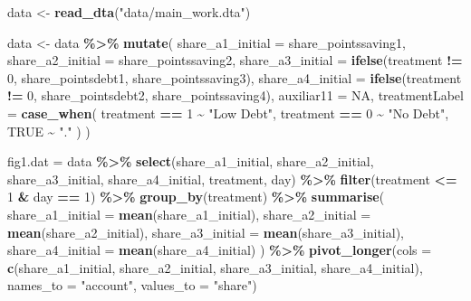 \documentclass[
]{article}
\newenvironment{Shaded}{\begin{snugshade}}{\end{snugshade}}
\newcommand{\AttributeTok}[1]{\textcolor[rgb]{0.13,0.29,0.53}{#1}}
\newcommand{\ConstantTok}[1]{\textcolor[rgb]{0.56,0.35,0.01}{#1}}
\newcommand{\DecValTok}[1]{\textcolor[rgb]{0.00,0.00,0.81}{#1}}
\newcommand{\FunctionTok}[1]{\textcolor[rgb]{0.13,0.29,0.53}{\textbf{#1}}}
\newcommand{\NormalTok}[1]{#1}
\newcommand{\OtherTok}[1]{\textcolor[rgb]{0.56,0.35,0.01}{#1}}
\newcommand{\SpecialCharTok}[1]{\textcolor[rgb]{0.81,0.36,0.00}{\textbf{#1}}}
\newcommand{\StringTok}[1]{\textcolor[rgb]{0.31,0.60,0.02}{#1}}
\begin{document}
\begin{Shaded}
\begin{Highlighting}[]
\NormalTok{data }\OtherTok{\textless{}{-}} \FunctionTok{read\_dta}\NormalTok{(}\StringTok{"data/main\_work.dta"}\NormalTok{)}

\NormalTok{data }\OtherTok{\textless{}{-}}\NormalTok{ data }\SpecialCharTok{\%\textgreater{}\%}
  \FunctionTok{mutate}\NormalTok{(}
    \AttributeTok{share\_a1\_initial =}\NormalTok{ share\_pointssaving1,}
    \AttributeTok{share\_a2\_initial =}\NormalTok{ share\_pointssaving2,}
    \AttributeTok{share\_a3\_initial =} \FunctionTok{ifelse}\NormalTok{(treatment }\SpecialCharTok{!=} \DecValTok{0}\NormalTok{, share\_pointsdebt1, share\_pointssaving3),}
    \AttributeTok{share\_a4\_initial =} \FunctionTok{ifelse}\NormalTok{(treatment }\SpecialCharTok{!=} \DecValTok{0}\NormalTok{, share\_pointsdebt2, share\_pointssaving4),}
    \AttributeTok{auxiliar11 =} \ConstantTok{NA}\NormalTok{,}
    \AttributeTok{treatmentLabel =} \FunctionTok{case\_when}\NormalTok{(}
\NormalTok{      treatment }\SpecialCharTok{==} \DecValTok{1} \SpecialCharTok{\textasciitilde{}} \StringTok{"Low Debt"}\NormalTok{,}
\NormalTok{      treatment }\SpecialCharTok{==} \DecValTok{0} \SpecialCharTok{\textasciitilde{}} \StringTok{"No Debt"}\NormalTok{,}
      \ConstantTok{TRUE} \SpecialCharTok{\textasciitilde{}} \StringTok{"."}
\NormalTok{    )}
\NormalTok{  )}

\NormalTok{fig1.dat }\OtherTok{=}\NormalTok{ data }\SpecialCharTok{\%\textgreater{}\%}
  \FunctionTok{select}\NormalTok{(share\_a1\_initial, share\_a2\_initial, share\_a3\_initial, share\_a4\_initial, treatment, day) }\SpecialCharTok{\%\textgreater{}\%}
  \FunctionTok{filter}\NormalTok{(treatment }\SpecialCharTok{\textless{}=} \DecValTok{1} \SpecialCharTok{\&}\NormalTok{ day }\SpecialCharTok{==} \DecValTok{1}\NormalTok{) }\SpecialCharTok{\%\textgreater{}\%}
  \FunctionTok{group\_by}\NormalTok{(treatment) }\SpecialCharTok{\%\textgreater{}\%}
  \FunctionTok{summarise}\NormalTok{(}
    \AttributeTok{share\_a1\_initial =} \FunctionTok{mean}\NormalTok{(share\_a1\_initial),}
    \AttributeTok{share\_a2\_initial =} \FunctionTok{mean}\NormalTok{(share\_a2\_initial),}
    \AttributeTok{share\_a3\_initial =} \FunctionTok{mean}\NormalTok{(share\_a3\_initial),}
    \AttributeTok{share\_a4\_initial =} \FunctionTok{mean}\NormalTok{(share\_a4\_initial)}
\NormalTok{  ) }\SpecialCharTok{\%\textgreater{}\%}
  \FunctionTok{pivot\_longer}\NormalTok{(}\AttributeTok{cols =} \FunctionTok{c}\NormalTok{(share\_a1\_initial, share\_a2\_initial, share\_a3\_initial, share\_a4\_initial), }\AttributeTok{names\_to =} \StringTok{"account"}\NormalTok{, }\AttributeTok{values\_to =} \StringTok{"share"}\NormalTok{)}


\end{Highlighting}
\end{Shaded}
\end{document}
